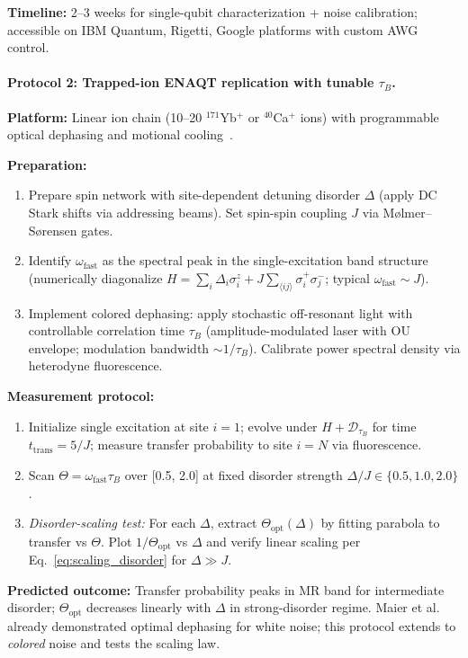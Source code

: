 \documentclass[11pt,letterpaper]{article}
\begin{document}
\textbf{Timeline:} 2--3 weeks for single-qubit characterization + noise
calibration; accessible on IBM Quantum, Rigetti, Google platforms with
custom AWG control.

\paragraph{Protocol 2: Trapped-ion ENAQT replication with tunable $\tau_B$.}
\textbf{Platform:} Linear ion chain (10--20 $^{171}$Yb$^+$ or
$^{40}$Ca$^+$ ions) with programmable optical dephasing and motional
cooling~\cite{Maier2019}.

\textbf{Preparation:}
\begin{enumerate}[nosep,leftmargin=*]
\item Prepare spin network with site-dependent detuning disorder $\Delta$
(apply DC Stark shifts via addressing beams). Set spin-spin coupling $J$
via Mølmer--Sørensen gates.
\item Identify $\omega_{\mathrm{fast}}$ as the spectral peak in the
single-excitation band structure (numerically diagonalize
$H=\sum_i\Delta_i\sigma_i^z + J\sum_{\langle ij\rangle}\sigma_i^+\sigma_j^-$;
typical $\omega_{\mathrm{fast}}\sim J$).
\item Implement colored dephasing: apply stochastic off-resonant light
with controllable correlation time $\tau_B$ (amplitude-modulated laser
with OU envelope; modulation bandwidth $\sim 1/\tau_B$). Calibrate power
spectral density via heterodyne fluorescence.
\end{enumerate}

\textbf{Measurement protocol:}
\begin{enumerate}[nosep,leftmargin=*]
\item Initialize single excitation at site $i=1$; evolve under
$H + \mathcal{D}_{\tau_B}$ for time $t_{\text{trans}}=5/J$; measure
transfer probability to site $i=N$ via fluorescence.
\item Scan $\Theta=\omega_{\mathrm{fast}}\tau_B$ over [0.5, 2.0] at fixed
disorder strength $\Delta/J\in\{0.5, 1.0, 2.0\}$.
\item \emph{Disorder-scaling test:} For each $\Delta$, extract
$\Theta_{\text{opt}}(\Delta)$ by fitting parabola to transfer vs $\Theta$.
Plot $1/\Theta_{\text{opt}}$ vs $\Delta$ and verify linear scaling per
Eq.~\eqref{eq:scaling_disorder} for $\Delta\gg J$.
\end{enumerate}

\textbf{Predicted outcome:} Transfer probability peaks in MR band for
intermediate disorder; $\Theta_{\text{opt}}$ decreases linearly with
$\Delta$ in strong-disorder regime. Maier et al.~\cite{Maier2019} already
demonstrated optimal dephasing for white noise; this protocol extends to
\emph{colored} noise and tests the scaling law.
\end{document}
